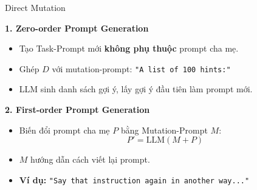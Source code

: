 \documentclass[english,main=vietnamese,xcolor=table]{beamer}
\begin{document}
\begin{frame}{Direct Mutation}

\textbf{1. Zero-order Prompt Generation}
\begin{itemize}
    \item Tạo Task-Prompt mới \textbf{không phụ thuộc} prompt cha mẹ.
    \item Ghép $D$ với mutation-prompt: \texttt{"A list of 100 hints:"}
    \item LLM sinh danh sách gợi ý, lấy gợi ý đầu tiên làm prompt mới.
\end{itemize}

\vspace{0.5em}

\textbf{2. First-order Prompt Generation}
\begin{itemize}
    \item Biến đổi prompt cha mẹ $P$ bằng Mutation-Prompt $M$:
    \[
        P' = \text{LLM}(M + P)
    \]
    \item $M$ hướng dẫn cách viết lại prompt.
    \item \textbf{Ví dụ:} \texttt{"Say that instruction again in another way..."}
\end{itemize}

\end{frame}

\end{document}

